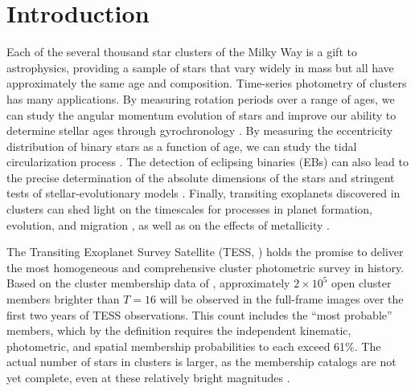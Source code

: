 \documentclass[12pt,twocolumn,tighten]{aastex62}
\begin{document}



\section{Introduction}
\label{sec:intro}

Each of the several thousand star clusters of the Milky Way is a
gift to astrophysics, providing a sample of stars that vary widely in
mass but all have approximately the same age and composition.
Time-series photometry of clusters has many applications. By measuring
rotation periods over a range of ages, we can study the angular
momentum evolution of stars and improve our ability to determine
stellar ages through gyrochronology \citep[{\it
e.g.},][]{skumanich_time_1972,barnes_color-period_2015,meibom_spin-down_2015,curtis_tess_2019}.
By measuring the eccentricity distribution of binary stars as a
function of age, we can study the tidal circularization process
\citep{meibom_robust_2005,milliman_wiyn_2014,price-whelan_binary_2018}.
The detection of eclipsing binaries (EBs) can also lead to the precise
determination of the absolute dimensions of the stars and stringent
tests of stellar-evolutionary models
\citep{luhman_formation_2012,stassun_review_2014,kraus_mass-radius_2015}.
Finally, transiting exoplanets discovered in clusters can shed light
on the timescales for processes in planet formation, evolution, and
migration
\citep[][]{Fortney_et_al_2007,Mann_K2_33b_2016,David_et_al_2017}, as
well as on the effects of metallicity
\citep[][]{fischer_planet-metallicity_2005,petigura_metallicity_2018}.

The Transiting Exoplanet Survey Satellite (TESS,
\citealt{ricker_transiting_2015}) holds the promise to deliver the
most homogeneous and comprehensive cluster photometric survey in
history.  Based on the cluster membership data of
\citet{Kharchenko_et_al_2013}, approximately $2\times10^5$ open
cluster members brighter than $T=16$ will be observed in the
full-frame images over the first two years of TESS observations.  This
count includes the ``most probable'' members, which by the
\citet{kharchenko_global_2012} definition requires the independent
kinematic, photometric, and spatial membership probabilities to each
exceed 61\%.  The actual number of stars in clusters is larger, as the
membership catalogs are not yet complete, even at these relatively
bright magnitudes \citep[{\it
e.g.},][]{roser_nine_RSG_2016,cantat-gaudin_gaia_2018,cantat-gaudin_newOCs_2019,kounkel_untangling_2019,sim_open_2019}.
\end{document}
